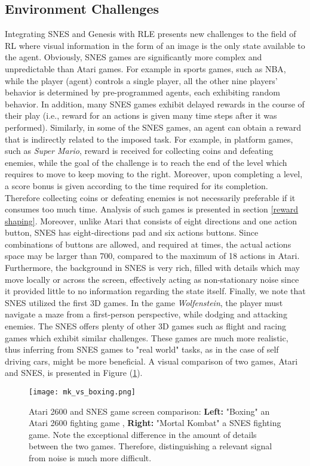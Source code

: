 \documentclass{article}
\begin{document}
\subsection{Environment Challenges}
Integrating SNES and Genesis with RLE presents new challenges to the field of RL where visual information in the form of an image is the only state available to the agent. Obviously, SNES games are significantly more complex and unpredictable than Atari games. For example in sports games, such as NBA, while the player (agent) controls a single player, all the other nine players' behavior is determined by pre-programmed agents, each exhibiting random behavior. 
In addition, many SNES games exhibit delayed rewards in the course of their play (i.e., reward for an actions is given many time steps after it was performed).
Similarly, in some of the SNES games, an agent can obtain a reward that is indirectly related to the imposed task. For example, in platform games, such as \textit{Super Mario}, reward is received for collecting coins and defeating enemies, while the goal of the challenge is to reach the end of the level which requires to move to keep moving to the right. Moreover, upon completing a level, a score bonus is given according to the time required for its completion. Therefore collecting coins or defeating enemies is not necessarily preferable if it consumes too much time. Analysis of such games is presented in section \ref{reward shaping}. 
Moreover, unlike Atari that consists of eight directions and one action button, SNES has eight-directions pad and six actions buttons. Since combinations of buttons are allowed, and required at times, the actual actions space may be larger than 700, compared to the maximum of 18 actions in Atari.
Furthermore, the background in SNES is very rich, filled with details which may move locally or across the screen, effectively acting as non-stationary noise since it provided little to no information regarding the state itself. 
Finally, we note that SNES utilized the first 3D games. In the game \textit{Wolfenstein}, the player must navigate a maze from a first-person perspective, while dodging and attacking enemies. The SNES offers plenty of other 3D games such as flight and racing games which exhibit similar challenges.
These games are much more realistic, thus inferring from SNES games to "real world" tasks, as in the case of self driving cars, might be more beneficial. A visual comparison of two games, Atari and SNES, is presented in Figure (\ref{fig:mv_vs_boxing}).

\begin{figure}[h!]
\texttt{[image: mk\_vs\_boxing.png]} 
\caption{Atari 2600 and SNES game screen comparison: \textbf{Left:} "Boxing" an Atari 2600 fighting game , \textbf{Right:} "Mortal Kombat" a SNES fighting game. Note the exceptional difference in the amount of details between the two games. Therefore, distinguishing a relevant signal from noise is much more difficult.}
\label{fig:mv_vs_boxing}
\end{figure}
\end{document}
